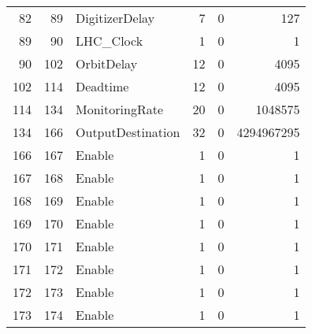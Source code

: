 \begin{table}[htbp]
\begin{tabular}{rrlrrr}
    82    & 89    & DigitizerDelay & 7     & 0     & 127 \\
    89    & 90    & LHC\_Clock & 1     & 0     & 1 \\
    90    & 102   & OrbitDelay & 12    & 0     & 4095 \\
    102   & 114   & Deadtime & 12    & 0     & 4095 \\
    114   & 134   & MonitoringRate & 20    & 0     & 1048575 \\
    134   & 166   & OutputDestination & 32    & 0     & 4294967295 \\
    166   & 167   & Enable & 1     & 0     & 1 \\
    167   & 168   & Enable & 1     & 0     & 1 \\
    168   & 169   & Enable & 1     & 0     & 1 \\
    169   & 170   & Enable & 1     & 0     & 1 \\
    170   & 171   & Enable & 1     & 0     & 1 \\
    171   & 172   & Enable & 1     & 0     & 1 \\
    172   & 173   & Enable & 1     & 0     & 1 \\
    173   & 174   & Enable & 1     & 0     & 1 \\
    \end{tabular}%
  \label{tab:VariableLayoutTLBConfigurationFULL}%
\end{table}%